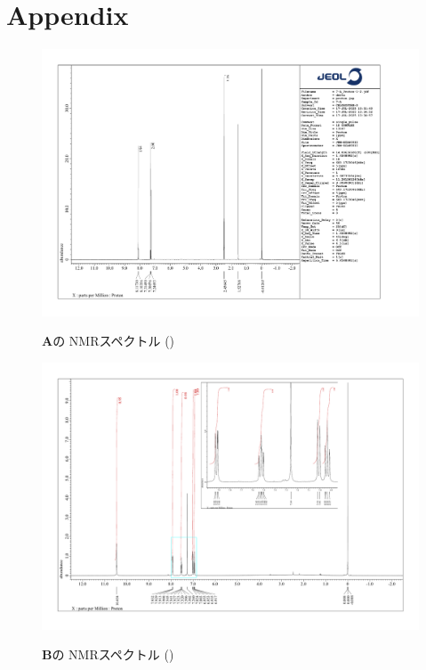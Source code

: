 \documentclass{ltjsarticle}
\theoremstyle{definition}
\numberwithin{equation}{section}
\begin{document}
\section{Appendix}
\begin{figure}[htbp]
\begin{center}
\includegraphics[width = 15 cm]{NMR_5-1-A.pdf}
\caption{\textbf{A}の NMRスペクトル ()}
\label{NMR_5-1-A}
\includegraphics[width = 15 cm]{NMR_5-1-B.pdf}
\caption{\textbf{B}の NMRスペクトル ()}
\label{NMR_5-1-B}
\end{center}
\end{figure}
\end{document}

